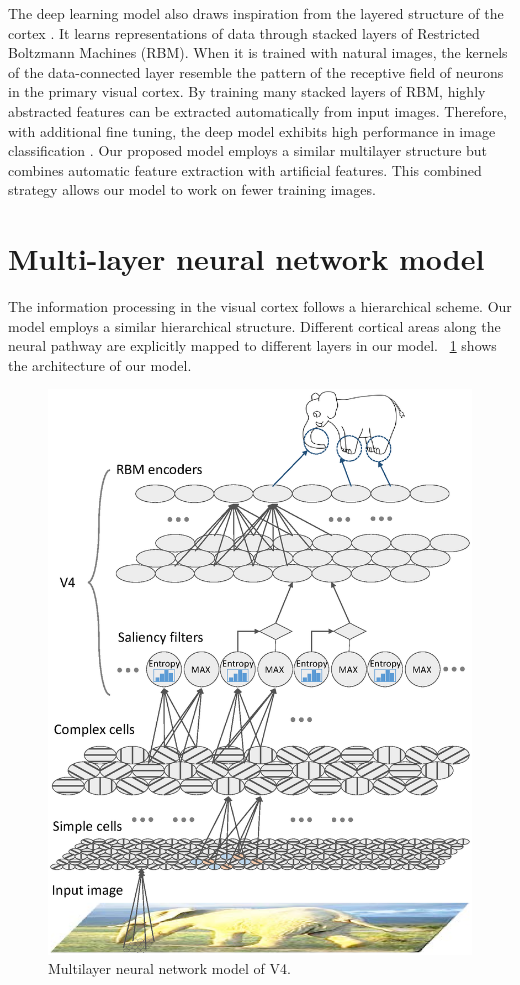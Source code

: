 \documentclass[10pt]{article}
\begin{document}
The deep learning model also draws inspiration from the layered structure of the cortex \cite{bengio2009}.
It learns representations of data through stacked layers of Restricted Boltzmann Machines (RBM).
When it is trained with natural images, 
the kernels of the data-connected layer resemble the pattern of the receptive field of neurons in the primary visual cortex.
By training many stacked layers of RBM, highly abstracted features can be extracted automatically from input images.
Therefore, with additional fine tuning, the deep model exhibits high performance in image classification \cite{krizhevsky2012}.
Our proposed model employs a similar multilayer structure but combines automatic feature extraction with artificial features.
This combined strategy allows our model to work on fewer training images.

\section{Multi-layer neural network model}\label{sec:3}

The information processing in the visual cortex follows a hierarchical scheme.
Our model employs a similar hierarchical structure.
Different cortical areas along the neural pathway are explicitly mapped to different layers in our model. 
\figurename~\ref{fig:3} shows the architecture of our model.

\begin{figure}
\centerline{\includegraphics[width=\linewidth]{images/fig3.eps}} 
\caption{Multilayer neural network model of V4.}
\label{fig:3}
\end{figure}
\end{document}
